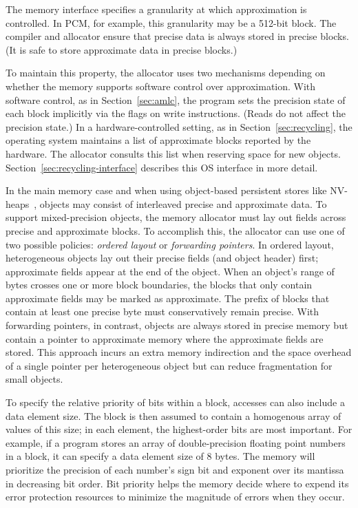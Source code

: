 \documentclass[prodmode,acmtocs]{acmsmall}
\begin{document}
The memory interface specifies a granularity at which approximation is
controlled. In PCM, for example, this granularity may be a 512-bit block. The
compiler and allocator ensure that precise data is always stored in
precise blocks.
(It is safe to store approximate data
in precise blocks.)

To maintain this property, the allocator uses
two mechanisms depending on whether the memory supports software control over
approximation.
With software control, as in Section~\ref{sec:amlc}, the program sets the precision state
of each block implicitly via the flags on write instructions. (Reads do not
affect the precision state.)
In a hardware-controlled setting, as in Section~\ref{sec:recycling}, the operating system maintains a
list of approximate blocks reported by the hardware.
The allocator consults this list when reserving
space for new objects. Section~\ref{sec:recycling-interface} describes this OS
interface in more detail.

In the main memory case and when using object-based persistent stores like
NV-heaps~\cite{nvheaps}, objects may consist of interleaved precise and
approximate data. To support mixed-precision objects, the memory allocator
must lay out fields across precise and approximate blocks.
To accomplish this, the allocator can use one of two possible policies:
\emph{ordered layout} or \emph{forwarding pointers}. In ordered
layout, heterogeneous objects lay out their
precise fields (and object header) first; approximate fields appear at the end
of the object. When an object's range of bytes crosses one or more block
boundaries, the blocks that only contain approximate fields may be marked as
approximate. The prefix of blocks that contain at least one precise byte must
conservatively remain precise. With forwarding pointers, in contrast, objects
are always stored in precise memory but contain a pointer to approximate memory
where the approximate fields are stored. This approach incurs an extra memory
indirection and the space overhead of a single pointer per heterogeneous object but can
reduce fragmentation for small objects.

To specify the relative
priority of bits within a block, accesses can also include a data
element size. The block is then assumed to contain a homogenous
array of values of this size; in each element, the highest-order bits
are most important. For example, if a program
stores an array of double-precision floating point numbers in a block,
it can specify a data element size of 8 bytes. The memory will
prioritize the precision of each number's sign bit and exponent over
its mantissa in decreasing bit order. Bit priority
helps the memory decide where to expend its error protection
resources to minimize the magnitude of errors when they occur.
\end{document}
